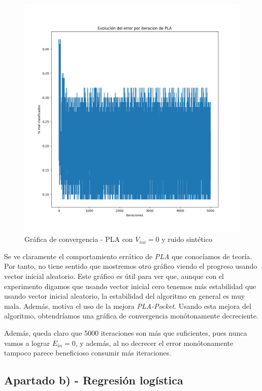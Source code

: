 \documentclass[11pt]{article}
\begin{document}
\begin{figure}[H]
    \centering
    \includegraphics[scale=0.4]{grafica_convergencia_pla_ruido_cero}
    \caption{Gráfica de convergencia - PLA con $V_{ini} = 0$ y ruido sintético}
\end{figure}

Se ve claramente el comportamiento errático de \emph{PLA} que conocíamos de teoría. Por tanto, no tiene sentido que mostremos otro gráfico viendo el progreso usando vector inicial aleatorio. Este gráfico es útil para ver que, aunque con el experimento digamos que usando vector inicial cero tenemos más estabilidad que usando vector inicial aleatorio, la estabilidad del algoritmo en general es muy mala. Además, motiva el uso de la mejora \emph{PLA-Pocket}. Usando esta mejora del algoritmo, obtendríamos una gráfica de convergencia monótonamente decreciente.

Además, queda claro que 5000 iteraciones son más que suficientes, pues nunca vamos a lograr $E_{in} = 0$, y además, al no decrecer el error monótonamente tampoco parece beneficioso consumir más iteraciones.

\pagebreak
\subsection{Apartado b) - Regresión logística}
\end{document}
